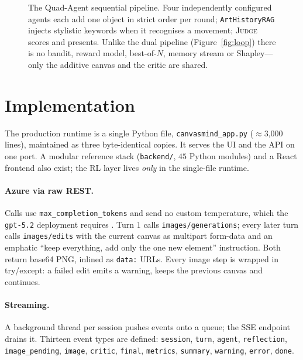 \documentclass[11pt]{article}
\newcommand{\code}[1]{\texttt{\small #1}}
\newcommand{\file}[1]{\textcolor{accent}{\texttt{\small #1}}}
\newcommand{\JUDGE}{\textsc{Judge}}
\theoremstyle{plain}
\theoremstyle{definition}
\begin{document}
\begin{figure}[t]
{}
\caption{The Quad-Agent sequential pipeline. Four independently configured agents
each add one object in strict order per round; \code{ArtHistoryRAG} injects
stylistic keywords when it recognises a movement; \JUDGE{} scores and presents.
Unlike the dual pipeline (Figure~\ref{fig:loop}) there is no bandit, reward model,
best-of-$N$, memory stream or Shapley---only the additive canvas and the critic
are shared.}
\label{fig:quad}
\end{figure}

\section{Implementation}
\label{sec:impl}
The production runtime is a single Python file, \file{canvasmind\_app.py}
($\approx$3{,}000 lines), maintained as three byte-identical copies. It serves
the UI and the API on one port. A modular reference stack (\file{backend/},
$45$ Python modules) and a React frontend also exist; the RL layer lives
\emph{only} in the single-file runtime.

\paragraph{Azure via raw REST.}
Calls use \code{max\_completion\_tokens} and send no custom temperature, which
the \code{gpt-5.2} deployment requires \citep{microsoft2025azure}. Turn $1$
calls \code{images/generations}; every later turn calls \code{images/edits} with
the current canvas as multipart form-data and an emphatic ``keep everything, add
only the one new element'' instruction. Both return base64 PNG, inlined as
\code{data:} URLs. Every image step is wrapped in try/except: a failed edit emits
a warning, keeps the previous canvas and continues.

\paragraph{Streaming.}
A background thread per session pushes events onto a queue; the SSE endpoint
drains it. Thirteen event types are defined: \code{session}, \code{turn},
\code{agent}, \code{reflection}, \code{image\_pending}, \code{image},
\code{critic}, \code{final}, \code{metrics}, \code{summary}, \code{warning},
\code{error}, \code{done}.
\end{document}
